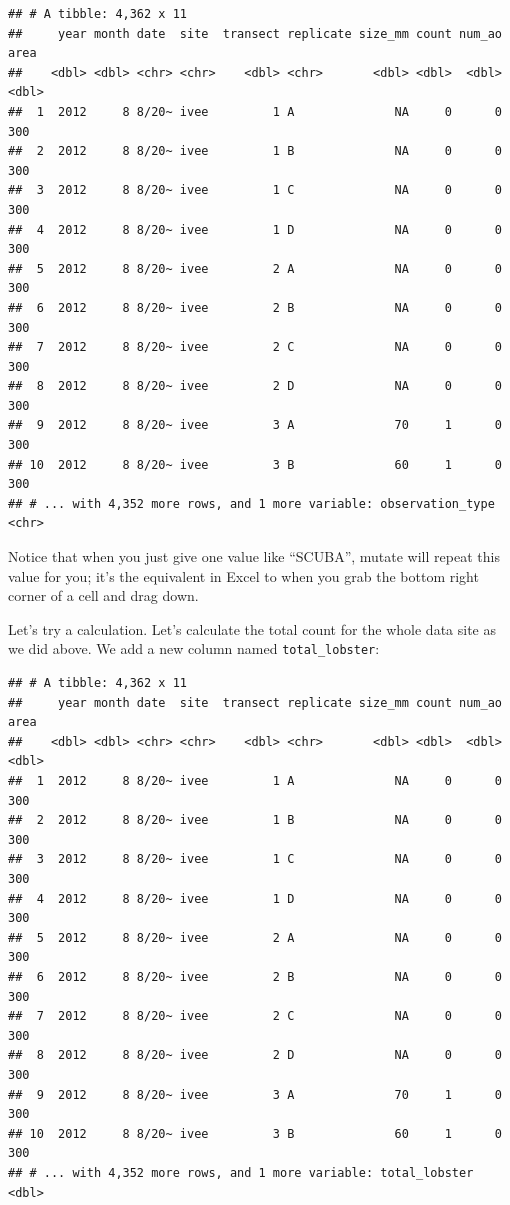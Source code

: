 \documentclass[]{book}
\newenvironment{Shaded}{\begin{snugshade}}{\end{snugshade}}
\newcommand{\DataTypeTok}[1]{\textcolor[rgb]{0.13,0.29,0.53}{#1}}
\newcommand{\KeywordTok}[1]{\textcolor[rgb]{0.13,0.29,0.53}{\textbf{#1}}}
\newcommand{\NormalTok}[1]{#1}
\newcommand{\OperatorTok}[1]{\textcolor[rgb]{0.81,0.36,0.00}{\textbf{#1}}}
\newcommand{\StringTok}[1]{\textcolor[rgb]{0.31,0.60,0.02}{#1}}
\begin{document}
\begin{verbatim}
## # A tibble: 4,362 x 11
##     year month date  site  transect replicate size_mm count num_ao  area
##    <dbl> <dbl> <chr> <chr>    <dbl> <chr>       <dbl> <dbl>  <dbl> <dbl>
##  1  2012     8 8/20~ ivee         1 A              NA     0      0   300
##  2  2012     8 8/20~ ivee         1 B              NA     0      0   300
##  3  2012     8 8/20~ ivee         1 C              NA     0      0   300
##  4  2012     8 8/20~ ivee         1 D              NA     0      0   300
##  5  2012     8 8/20~ ivee         2 A              NA     0      0   300
##  6  2012     8 8/20~ ivee         2 B              NA     0      0   300
##  7  2012     8 8/20~ ivee         2 C              NA     0      0   300
##  8  2012     8 8/20~ ivee         2 D              NA     0      0   300
##  9  2012     8 8/20~ ivee         3 A              70     1      0   300
## 10  2012     8 8/20~ ivee         3 B              60     1      0   300
## # ... with 4,352 more rows, and 1 more variable: observation_type <chr>
\end{verbatim}

Notice that when you just give one value like ``SCUBA'', mutate will repeat this value for you; it's the equivalent in Excel to when you grab the bottom right corner of a cell and drag down.

Let's try a calculation. Let's calculate the total count for the whole data site as we did above. We add a new column named \texttt{total\_lobster}:

\begin{Shaded}
\end{Shaded}

\begin{verbatim}
## # A tibble: 4,362 x 11
##     year month date  site  transect replicate size_mm count num_ao  area
##    <dbl> <dbl> <chr> <chr>    <dbl> <chr>       <dbl> <dbl>  <dbl> <dbl>
##  1  2012     8 8/20~ ivee         1 A              NA     0      0   300
##  2  2012     8 8/20~ ivee         1 B              NA     0      0   300
##  3  2012     8 8/20~ ivee         1 C              NA     0      0   300
##  4  2012     8 8/20~ ivee         1 D              NA     0      0   300
##  5  2012     8 8/20~ ivee         2 A              NA     0      0   300
##  6  2012     8 8/20~ ivee         2 B              NA     0      0   300
##  7  2012     8 8/20~ ivee         2 C              NA     0      0   300
##  8  2012     8 8/20~ ivee         2 D              NA     0      0   300
##  9  2012     8 8/20~ ivee         3 A              70     1      0   300
## 10  2012     8 8/20~ ivee         3 B              60     1      0   300
## # ... with 4,352 more rows, and 1 more variable: total_lobster <dbl>
\end{verbatim}
\end{document}
